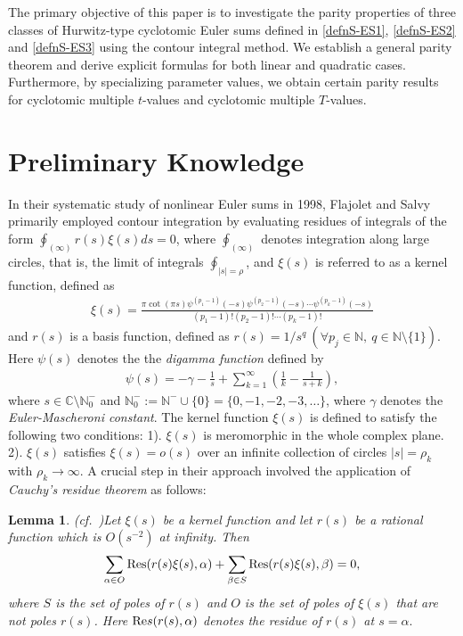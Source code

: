 \documentclass[11pt]{article}
\let\oldsection\section
\renewcommand\section{\setcounter{equation}{0}\oldsection}
\def\N{\mathbb{N}}
\theoremstyle{plain}
\newtheorem{lem}[thm]{Lemma}
\theoremstyle{definition}
\begin{document}
The primary objective of this paper is to investigate the parity properties of three classes of Hurwitz-type cyclotomic Euler sums defined in \eqref{defnS-ES1}, \eqref{defnS-ES2} and \eqref{defnS-ES3} using the contour integral method. We establish a general parity theorem and derive explicit formulas for both linear and quadratic cases. Furthermore, by specializing parameter values, we obtain certain parity results for cyclotomic multiple $t$-values and cyclotomic multiple $T$-values.

\section{Preliminary Knowledge}
In their systematic study of nonlinear Euler sums in 1998, Flajolet and Salvy \cite{Flajolet-Salvy} primarily employed contour integration by evaluating residues of integrals of the form $\oint_{(\infty)} r(s)\xi(s) ds=0$, where $\oint_{(\infty)}$ denotes integration along large circles, that is, the limit of integrals $\oint_{|s|=\rho}$, and $\xi(s)$ is referred to as a kernel function, defined as
\begin{align*}
\xi(s)=\frac{\pi\cot(\pi s)\psi^{(p_1-1)}(-s)\psi^{(p_2-1)}(-s)\cdots \psi^{(p_k-1)}(-s)}{(p_1-1)!(p_2-1)!\cdots(p_k-1)!}
\end{align*} and $r(s)$ is a basis function, defined as $r(s)=1/s^q\ (\forall p_j\in\N,\ q\in \N\setminus \{1\})$. Here $\psi(s)$ denotes the the \emph{digamma function} defined by
\begin{align}\label{defn-classical-psi-funtion}
\psi(s)=-\gamma-\frac1{s}+\sum_{k=1}^\infty \left(\frac1{k}-\frac{1}{s+k}\right),
\end{align}
where $s\in\mathbb{C}\setminus \N_0^-$ and $\N_0^-:=\N^-\cup\{0\}=\{0,-1,-2,-3,\ldots\}$, where $\gamma$ denotes the \emph{Euler-Mascheroni constant}. The kernel function $\xi(s)$ is defined to satisfy the following two conditions:
 1). $\xi(s)$ is meromorphic in the whole complex plane. 2). $\xi(s)$ satisfies $\xi(s)=o(s)$ over an infinite collection of circles $\left| s \right| = {\rho _k}$ with ${\rho _k} \to \infty $.
A crucial step in their approach involved the application of \emph{Cauchy's residue theorem} as follows:
\begin{lem}\emph{(cf.\ \cite[Lem. 2.1]{Flajolet-Salvy})}\label{lem-redisue-thm}
Let $\xi(s)$ be a kernel function and let $r(s)$ be a rational function which is $O(s^{-2})$ at infinity. Then
\begin{align}\label{residue-}
\sum\limits_{\alpha  \in O} {{\mathop{\rm Res}}{{\left( {r(s)\xi(s)},\alpha  \right)}}}  + \sum\limits_{\beta  \in S}  {{\mathop{\rm Res}}{{\left( {r(s)\xi(s)}, \beta  \right)}}}  = 0,
\end{align}
where $S$ is the set of poles of $r(s)$ and $O$ is the set of poles of $\xi(s)$ that are not poles $r(s)$. Here ${\mathop{\rm Re}\nolimits} s{\left( {r(s)},\alpha \right)} $ denotes the residue of $r(s)$ at $s= \alpha.$
\end{lem}
\end{document}
